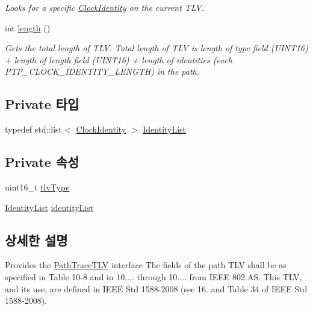 \begin{DoxyCompactItemize}
\begin{DoxyCompactList}\small\item\em Looks for a specific \hyperlink{class_clock_identity}{Clock\+Identity} on the current T\+LV. \end{DoxyCompactList}\item 
int \hyperlink{class_path_trace_t_l_v_a3d0f4ae571310c6ed081daa3985ecb47}{length} ()
\begin{DoxyCompactList}\small\item\em Gets the total length of T\+LV. Total length of T\+LV is length of type field (U\+I\+N\+T16) + length of \textquotesingle{}length\textquotesingle{} field (U\+I\+N\+T16) + length of identities (each P\+T\+P\+\_\+\+C\+L\+O\+C\+K\+\_\+\+I\+D\+E\+N\+T\+I\+T\+Y\+\_\+\+L\+E\+N\+G\+TH) in the path. \end{DoxyCompactList}\end{DoxyCompactItemize}
\subsection*{Private 타입}
\begin{DoxyCompactItemize}
\item 
typedef std\+::list$<$ \hyperlink{class_clock_identity}{Clock\+Identity} $>$ \hyperlink{class_path_trace_t_l_v_addaa66b9d2dcec592261ff4e954f10c9}{Identity\+List}
\end{DoxyCompactItemize}
\subsection*{Private 속성}
\begin{DoxyCompactItemize}
\item 
uint16\+\_\+t \hyperlink{class_path_trace_t_l_v_a90baf0e86e13da82746e3aab1436388b}{tlv\+Type}
\item 
\hyperlink{class_path_trace_t_l_v_addaa66b9d2dcec592261ff4e954f10c9}{Identity\+List} \hyperlink{class_path_trace_t_l_v_a4ad44abdc38822ab7966b4e175df0807}{identity\+List}
\end{DoxyCompactItemize}


\subsection{상세한 설명}
Provides the \hyperlink{class_path_trace_t_l_v}{Path\+Trace\+T\+LV} interface The fields of the path T\+LV shall be as specified in Table 10-\/8 and in 10.... through 10.... from I\+E\+EE 802.\+AS. This T\+LV, and its use, are defined in I\+E\+EE Std 1588-\/2008 (see 16. and Table 34 of I\+E\+EE Std 1588-\/2008). 

